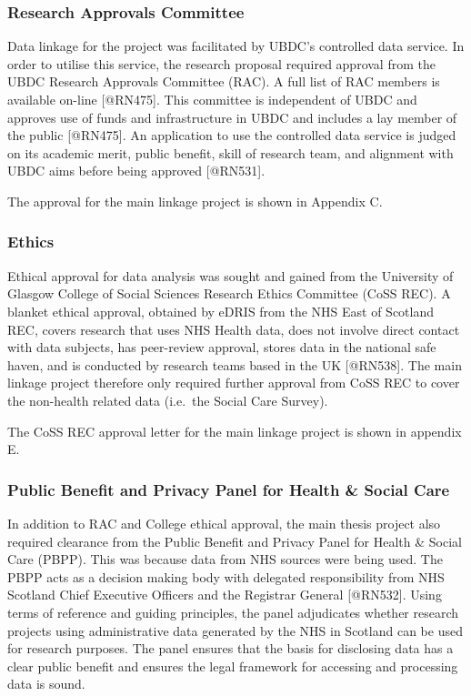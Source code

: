 \documentclass[]{article}
\begin{document}
\subsubsection{Research Approvals Committee}\label{subsec:rac}

Data linkage for the project was facilitated by UBDC's controlled data
service. In order to utilise this service, the research proposal
required approval from the UBDC Research Approvals Committee (RAC). A
full list of RAC members is available on-line {[}@RN475{]}. This
committee is independent of UBDC and approves use of funds and
infrastructure in UBDC and includes a lay member of the public
{[}@RN475{]}. An application to use the controlled data service is
judged on its academic merit, public benefit, skill of research team,
and alignment with UBDC aims before being approved {[}@RN531{]}.

The approval for the main linkage project is shown in Appendix C.

\subsubsection{Ethics}\label{subsec:ethics}

Ethical approval for data analysis was sought and gained from the
University of Glasgow College of Social Sciences Research Ethics
Committee (CoSS REC). A blanket ethical approval, obtained by eDRIS from
the NHS East of Scotland REC, covers research that uses NHS Health data,
does not involve direct contact with data subjects, has peer-review
approval, stores data in the national safe haven, and is conducted by
research teams based in the UK {[}@RN538{]}. The main linkage project
therefore only required further approval from CoSS REC to cover the
non-health related data (i.e.~the Social Care Survey).

The CoSS REC approval letter for the main linkage project is shown in
appendix E.

\subsubsection{Public Benefit and Privacy Panel for Health \& Social Care}\label{subsec:pbpp}

In addition to RAC and College ethical approval, the main thesis project
also required clearance from the Public Benefit and Privacy Panel for
Health \& Social Care (PBPP). This was because data from NHS sources
were being used. The PBPP acts as a decision making body with delegated
responsibility from NHS Scotland Chief Executive Officers and the
Registrar General {[}@RN532{]}. Using terms of reference and guiding
principles, the panel adjudicates whether research projects using
administrative data generated by the NHS in Scotland can be used for
research purposes. The panel ensures that the basis for disclosing data
has a clear public benefit and ensures the legal framework for accessing
and processing data is sound.
\end{document}
